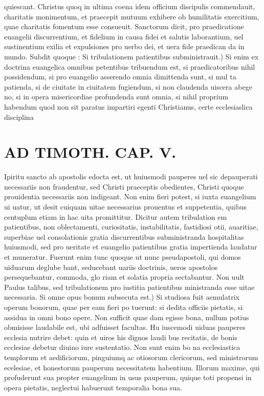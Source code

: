 \documentclass{article}
\begin{document}
\begin{pages}
quiescant. Christus quoq in ultima coena idem officium discipulis commendauit, charitatis monimentum, et praecepit mutuum exhibere ob humilitatis exercitium, quae charitatis fomentum esse consueuit. Sanctorum dicit, pro praedicatione euangelii discurrentium, et fidelium in causa fidei et salutis laborantium, uel sustinentium exilia et expulsiones pro uerbo dei, et uera fide praedican da in mundo. Subdit quoque : Si tribulationem patientibus subministrauit.) Si enim ex doctrina euangelica omnibus petentibus tribuendum est, si praedicatoribus nihil possidendum, si pro euangelio asserendo omnia dimittenda sunt, si mul ta patienda, si de ciuitate in ciuitatem fugiendum, si non claudenda uiscera abege no, si in opera misericordiae profundenda sunt omnia, si nihil proprium habendum quod non sit paratus impartiri egenti Christianus, certe ecclesiaslica disciplina  \pend
\section*{AD TIMOTH. CAP. V. }
\marginpar{[ p.519 ]}\pstart Ipiritu sancto ab apostolis edocta est, ut huiusmodi pauperes uel sic depauperati necessariis non fraudentur, sed Christi praeceptis obedientes, Christi quoque prouidentia necessariis non indigeant. Non enim fieri potest, si iuxta euangelium ui uatur, ut desit cuiquam uitae necessarius prouentus et suppetentia, quibus centuplum etiam in hac uita promittitur. Dicitur autem tribulation em patientibus, non oblectamenti, curiositatis, instabilitatis, fastidiosi otii, auaritiae, superbiae uel consolationis gratia discurrentibus subministranda hospitalitas huiusmodi, sed pro ueritate et euangelio patientibus gratia impertienda laudatur et muneratur. Fuerunt enim tunc quoque ut nunc pseudapostoli, qui domos uiduarum deglube bant, seducebant uariis doctrinis, ueros apostolos persequebantur, commoda, glo riam et solatia propria sectabantur. Non uult Paulus talibus, sed tribulationem pro iustitia patientibus ministranda esse uitae necessaria. Si omne opus bonum subsecuta est.) Si studiosa fuit aemulatrix operum bonorum, quae per eam fieri po tuerunt: si dedita officiis pietatis, si assidua in omni bono opere. Non sufficit quae dam egisse bona, nullum potius obmisisse laudabile est, ubi adfuisset facultas. Hu iuscemodi uiduas pauperes ecclesia nutrire debet: quin et uiros his dignos laudi bus recitatis, de bonis ecclesiae debetur diuino iure sustentatio. Non sunt enim bo na ecclesiastica templorum et aedificiorum, pinguiumq ac otiosorum clericorum, sed ministrorum ecelesiae, et honestorum pauperum necessitatem habentium. Illorum maxime, qui profuderunt sua propter euangelium in usus pauperum, quique  toti propensi in opera pietatis, neglectui habuerunt temporalia bona sua.  \pend
{}
{}

\end{pages}
\end{document}
